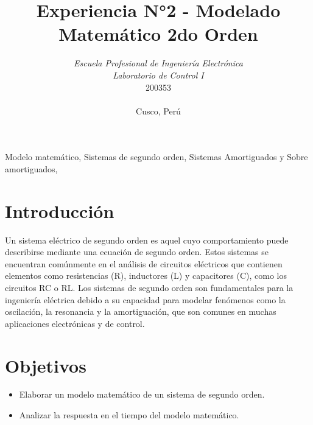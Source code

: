 \documentclass[conference]{IEEEtran}
\begin{document}
	
	\title{Experiencia N°2 - Modelado Matemático 2do Orden}
	\author{	
		\textit{Escuela Profesional de Ingeniería Electrónica}\\
		\textit{Laboratorio de Control I}\\
		200353 \\\\
		Cusco, Perú
	}
	
	\maketitle
	
	\begin{abstract}
		
	\end{abstract}
	
	\begin{IEEEkeywords}
		Modelo matemático, Sistemas de segundo orden, Sistemas Amortiguados y Sobre amortiguados, 
	\end{IEEEkeywords}
	
	\section{Introducción}
	Un sistema eléctrico de segundo orden es aquel cuyo comportamiento puede describirse mediante una ecuación de segundo orden. Estos sistemas se encuentran comúnmente en el análisis de circuitos eléctricos que contienen elementos como resistencias (R), inductores (L) y capacitores (C), como los circuitos RC o RL. Los sistemas de segundo orden son fundamentales para la ingeniería eléctrica debido a su capacidad para modelar fenómenos como la oscilación, la resonancia y la amortiguación, que son comunes en muchas aplicaciones electrónicas y de control.
	
	\section{Objetivos}
	
	\begin{itemize}
		\item Elaborar un modelo matemático de un sistema de segundo orden.
		\item Analizar la respuesta en el tiempo del modelo matemático.
	\end{itemize}
	
\end{document}
